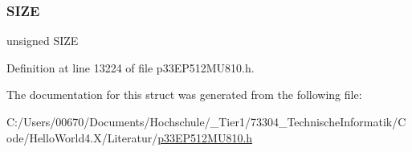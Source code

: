 \subsubsection{\texorpdfstring{S\+I\+ZE}{SIZE}}
{\footnotesize\ttfamily unsigned S\+I\+ZE}



Definition at line 13224 of file p33\+E\+P512\+M\+U810.\+h.



The documentation for this struct was generated from the following file\+:\begin{DoxyCompactItemize}
\item 
C\+:/\+Users/00670/\+Documents/\+Hochschule/\+\_\+\+Tier1/73304\+\_\+\+Technische\+Informatik/\+Code/\+Hello\+World4.\+X/\+Literatur/\hyperlink{p33_e_p512_m_u810_8h}{p33\+E\+P512\+M\+U810.\+h}\end{DoxyCompactItemize}
